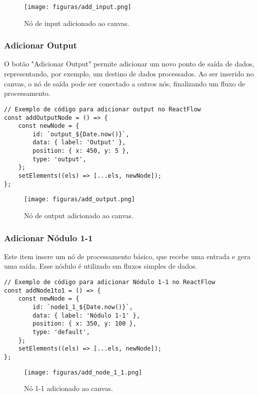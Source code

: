 \begin{figure}[htbp]
    \centering
    \texttt{[image: figuras/add\_input.png]}
    \caption{Nó de input adicionado ao canvas.}
    \label{Fig:AddInput}
\end{figure}

\subsubsection{Adicionar Output}

O botão "Adicionar Output" permite adicionar um novo ponto de saída de dados, representando, por exemplo, um destino de dados processados. Ao ser inserido no canvas, o nó de saída pode ser conectado a outros nós, finalizando um fluxo de processamento.

\begin{verbatim}
// Exemplo de código para adicionar output no ReactFlow
const addOutputNode = () => {
    const newNode = {
        id: `output_${Date.now()}`,
        data: { label: 'Output' },
        position: { x: 450, y: 5 },
        type: 'output',
    };
    setElements((els) => [...els, newNode]);
};
\end{verbatim}

\begin{figure}[htbp]
    \centering
    \texttt{[image: figuras/add\_output.png]}
    \caption{Nó de output adicionado ao canvas.}
    \label{Fig:AddOutput}
\end{figure}

\subsubsection{Adicionar Nódulo 1-1}

Este item insere um nó de processamento básico, que recebe uma entrada e gera uma saída. Esse nódulo é utilizado em fluxos simples de dados.

\begin{verbatim}
// Exemplo de código para adicionar Nódulo 1-1 no ReactFlow
const addNode1to1 = () => {
    const newNode = {
        id: `node1_1_${Date.now()}`,
        data: { label: 'Nódulo 1-1' },
        position: { x: 350, y: 100 },
        type: 'default',
    };
    setElements((els) => [...els, newNode]);
};
\end{verbatim}

\begin{figure}[htbp]
    \centering
    \texttt{[image: figuras/add\_node\_1\_1.png]}
    \caption{Nó 1-1 adicionado ao canvas.}
    \label{Fig:AddNode1to1}
\end{figure}

